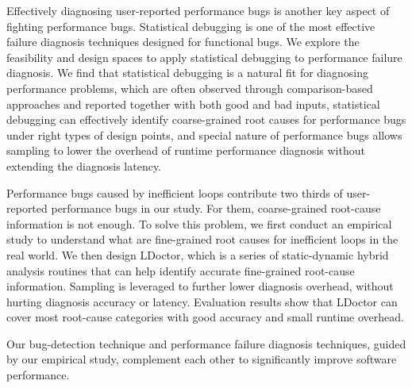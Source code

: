 Effectively diagnosing user-reported performance bugs is another key aspect of fighting performance bugs. 
Statistical debugging is one of the most effective failure diagnosis techniques designed for functional bugs. 
We explore the feasibility and design spaces to apply statistical debugging to performance failure diagnosis. 
We find that statistical debugging is a natural fit for diagnosing performance problems, 
which are often observed through comparison-based approaches and reported together 
with both good and bad inputs,
statistical debugging can effectively identify coarse-grained root causes 
for performance bugs under right types of design points, 
and special nature of performance bugs allows sampling to lower the 
overhead of runtime performance diagnosis without extending the diagnosis latency.

Performance bugs caused by inefficient loops contribute two thirds of user-reported performance bugs in our study. 
For them, coarse-grained root-cause information is not enough. 
To solve this problem, we first conduct an empirical study to understand what are fine-grained root
causes for inefficient loops in the real world. 
We then design LDoctor, which is a series of static-dynamic 
hybrid analysis routines that can help identify accurate fine-grained root-cause information. 
Sampling is leveraged to further lower diagnosis overhead, without hurting diagnosis accuracy or latency. 
Evaluation results show that LDoctor can cover most root-cause categories with good accuracy and small runtime overhead.

Our bug-detection technique and performance failure diagnosis techniques, 
guided by our empirical study, 
complement each other to significantly improve software performance. 
